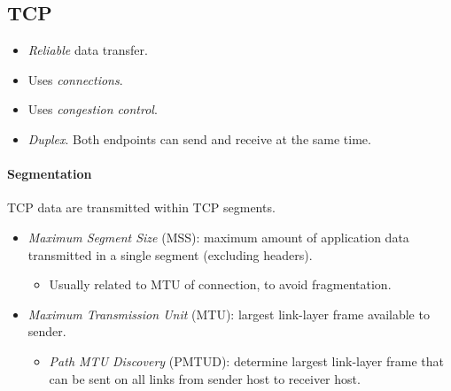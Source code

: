\documentclass[twocolumn,english]{article}
\begin{document}
\subsection{TCP}
\begin{itemize}
\item \emph{Reliable} data transfer.
\item Uses \emph{connections}.
\item Uses \emph{congestion control}.
\item \emph{Duplex}. Both endpoints can send and receive at the same time.
\end{itemize}

\paragraph{Segmentation}

TCP data are transmitted within TCP segments.
\begin{itemize}
\item \emph{Maximum Segment Size} (MSS): maximum amount of application data
transmitted in a single segment (excluding headers).
\begin{itemize}
\item Usually related to MTU of connection, to avoid fragmentation.
\end{itemize}
\item \emph{Maximum Transmission Unit} (MTU): largest link-layer frame available
to sender.
\begin{itemize}
\item \emph{Path MTU Discovery} (PMTUD): determine largest link-layer frame
that can be sent on all links from sender host to receiver host.
\end{itemize}
\end{itemize}
\end{document}
